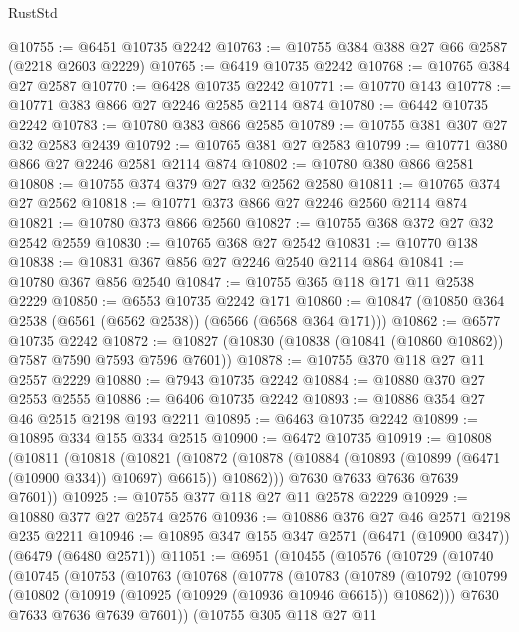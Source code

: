 \begin{lexlean}{RustStd}
\begin{coremodule}
@10755 := @6451 @10735 @2242
@10763 := @10755 @384 @388 @27 @66 @2587 (@2218 @2603 @2229)
@10765 := @6419 @10735 @2242
@10768 := @10765 @384 @27 @2587
@10770 := @6428 @10735 @2242
@10771 := @10770 @143
@10778 := @10771 @383 @866 @27 @2246 @2585 @2114 @874
@10780 := @6442 @10735 @2242
@10783 := @10780 @383 @866 @2585
@10789 := @10755 @381 @307 @27 @32 @2583 @2439
@10792 := @10765 @381 @27 @2583
@10799 := @10771 @380 @866 @27 @2246 @2581 @2114 @874
@10802 := @10780 @380 @866 @2581
@10808 := @10755 @374 @379 @27 @32 @2562 @2580
@10811 := @10765 @374 @27 @2562
@10818 := @10771 @373 @866 @27 @2246 @2560 @2114 @874
@10821 := @10780 @373 @866 @2560
@10827 := @10755 @368 @372 @27 @32 @2542 @2559
@10830 := @10765 @368 @27 @2542
@10831 := @10770 @138
@10838 := @10831 @367 @856 @27 @2246 @2540 @2114 @864
@10841 := @10780 @367 @856 @2540
@10847 := @10755 @365 @118 @171 @11 @2538 @2229
@10850 := @6553 @10735 @2242 @171
@10860 := @10847 (@10850 @364 @2538 (@6561 (@6562 @2538)) (@6566 (@6568 @364 @171)))
@10862 := @6577 @10735 @2242
@10872 := @10827 (@10830 (@10838 (@10841 (@10860 @10862)) @7587 @7590 @7593 @7596 @7601))
@10878 := @10755 @370 @118 @27 @11 @2557 @2229
@10880 := @7943 @10735 @2242
@10884 := @10880 @370 @27 @2553 @2555
@10886 := @6406 @10735 @2242
@10893 := @10886 @354 @27 @46 @2515 @2198 @193 @2211
@10895 := @6463 @10735 @2242
@10899 := @10895 @334 @155 @334 @2515
@10900 := @6472 @10735
@10919 := @10808
    (@10811
      (@10818
        (@10821
          (@10872 (@10878 (@10884 (@10893 (@10899 (@6471 (@10900 @334)) @10697) @6615)) @10862)))
        @7630
        @7633
        @7636
        @7639
        @7601))
@10925 := @10755 @377 @118 @27 @11 @2578 @2229
@10929 := @10880 @377 @27 @2574 @2576
@10936 := @10886 @376 @27 @46 @2571 @2198 @235 @2211
@10946 := @10895 @347 @155 @347 @2571 (@6471 (@10900 @347)) (@6479 (@6480 @2571))
@11051 := @6951
    (@10455
      (@10576
        (@10729
          (@10740
            (@10745
              (@10753
                (@10763
                  (@10768
                    (@10778
                      (@10783
                        (@10789
                          (@10792
                            (@10799
                              (@10802 (@10919 (@10925 (@10929 (@10936 @10946 @6615)) @10862)))
                              @7630
                              @7633
                              @7636
                              @7639
                              @7601))
                          (@10755
                            @305
                            @118
                            @27
                            @11

\end{coremodule}
\end{lexlean}
